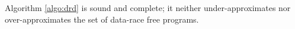 \begin{theorem} \label{thm:graph}
Algorithm \ref{algo:drd} is sound and complete; it neither under-approximates nor over-approximates the set of data-race free programs.
\end{theorem}

